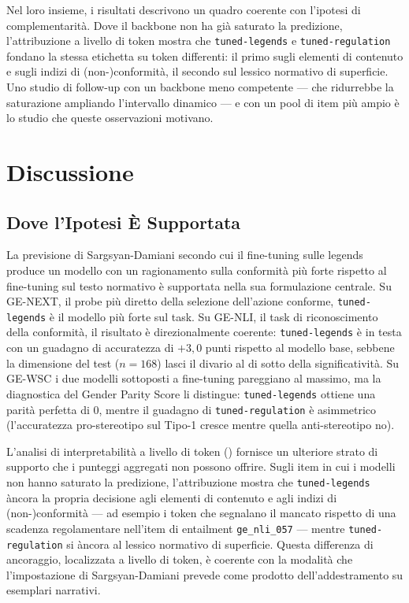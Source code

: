 \documentclass[pdflatex, sn-apa]{sn-jnl}%
\theoremstyle{thmstyleone}%
\theoremstyle{thmstyletwo}%
\theoremstyle{thmstylethree}%
\newcommand{\modellegends}{\texttt{tuned-legends}}
\newcommand{\modelreg}{\texttt{tuned-regulation}}
\begin{document}
Nel loro insieme, i risultati descrivono un quadro coerente con l'ipotesi di
complementarità. Dove il backbone non ha già saturato la predizione, l'attribuzione
a livello di token mostra che \modellegends{} e \modelreg{} fondano la stessa
etichetta su token differenti: il primo sugli elementi di contenuto e sugli indizi
di (non-)conformità, il secondo sul lessico normativo di superficie. Uno studio di
follow-up con un backbone meno competente --- che ridurrebbe la saturazione
ampliando l'intervallo dinamico --- e con un pool di item più ampio è lo studio che
queste osservazioni motivano.

\FloatBarrier


\section{Discussione}
\label{sec:discussion}

\subsection{Dove l'Ipotesi È Supportata}
\label{sec:disc:supported}

La previsione di Sargsyan-Damiani secondo cui il fine-tuning sulle legends produce
un modello con un ragionamento sulla conformità più forte rispetto al fine-tuning
sul testo normativo è supportata nella sua formulazione centrale. Su GE-NEXT, il
probe più diretto della selezione dell'azione conforme, \modellegends{} è il
modello più forte sul task. Su GE-NLI, il task di riconoscimento della conformità,
il risultato è direzionalmente coerente: \modellegends{} è in testa con un
guadagno di accuratezza di $+3,0$ punti rispetto al modello base, sebbene la
dimensione del test ($n=168$) lasci il divario al di sotto della significatività.
Su GE-WSC i due modelli sottoposti a fine-tuning pareggiano al massimo, ma la
diagnostica del Gender Parity Score li distingue: \modellegends{} ottiene una
parità perfetta di 0, mentre il guadagno di \modelreg{} è asimmetrico
(l'accuratezza pro-stereotipo sul Tipo-1 cresce mentre quella anti-stereotipo no).

L'analisi di interpretabilità a livello di token () fornisce un
ulteriore strato di supporto che i punteggi aggregati non possono offrire. Sugli
item in cui i modelli non hanno saturato la predizione, l'attribuzione mostra che
\modellegends{} àncora la propria decisione agli elementi di contenuto e agli
indizi di (non-)conformità --- ad esempio i token che segnalano il mancato
rispetto di una scadenza regolamentare nell'item di entailment
\texttt{ge\_nli\_057} --- mentre \modelreg{} si àncora al lessico normativo di
superficie. Questa differenza di ancoraggio, localizzata a livello di token, è
coerente con la modalità che l'impostazione di Sargsyan-Damiani prevede come
prodotto dell'addestramento su esemplari narrativi.
\end{document}
